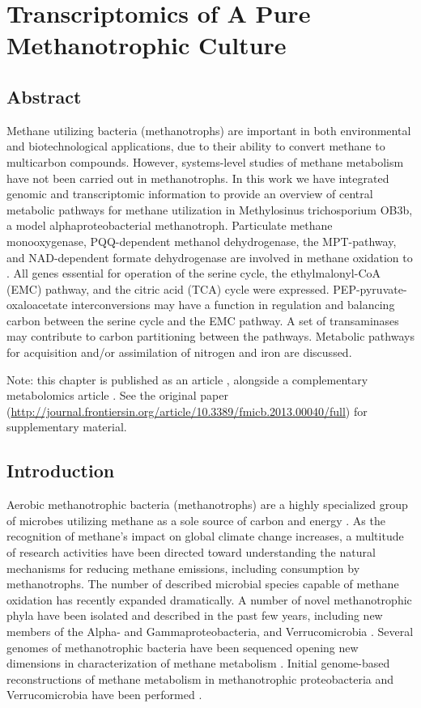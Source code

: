 \chapter{Transcriptomics of A Pure Methanotrophic Culture}
\label{chapter:A}


\section{Abstract}
Methane utilizing bacteria (methanotrophs) are important in both environmental and biotechnological applications, due to their ability to convert methane to multicarbon compounds.
However, systems-level studies of methane metabolism have not been carried out in methanotrophs.
In this work we have integrated genomic and transcriptomic information to provide an overview of central metabolic pathways for methane utilization in Methylosinus trichosporium OB3b, a model alphaproteobacterial methanotroph.
Particulate methane monooxygenase, PQQ-dependent methanol dehydrogenase, the MPT-pathway, and NAD-dependent formate dehydrogenase are involved in methane oxidation to .
All genes essential for operation of the serine cycle, the ethylmalonyl-CoA (EMC) pathway, and the citric acid (TCA) cycle were expressed.
PEP-pyruvate-oxaloacetate interconversions may have a function in regulation and balancing carbon between the serine cycle and the EMC pathway.
A set of transaminases may contribute to carbon partitioning between the pathways.
Metabolic pathways for acquisition and/or assimilation of nitrogen and iron are discussed.

Note: this chapter is published as an article \cite{matsenOB3b}, alongside a complementary metabolomics article \cite{yangOB3b}.
See the original paper (\url{http://journal.frontiersin.org/article/10.3389/fmicb.2013.00040/full}) for supplementary material.

\section{Introduction}
Aerobic methanotrophic bacteria (methanotrophs) are a highly specialized group of microbes utilizing methane as a sole source of carbon and energy \cite{hanson1996, murrell2009}.
As the recognition of methane’s impact on global climate change increases, a multitude of research activities have been directed toward understanding the natural mechanisms for reducing methane emissions, including consumption by methanotrophs.
The number of described microbial species capable of methane oxidation has recently expanded dramatically.
A number of novel methanotrophic phyla have been isolated and described in the past few years, including new members of the Alpha- and Gammaproteobacteria, and Verrucomicrobia \cite{trotsenko2008, mila2009, murrell2009}.
Several genomes of methanotrophic bacteria have been sequenced opening new dimensions in characterization of methane metabolism \cite{ward2004, dunfield2007, hou2008, chen2010, stein2010, stein2011, dam2012b}.
Initial genome-based reconstructions of methane metabolism in methanotrophic proteobacteria and Verrucomicrobia have been performed \cite{ward2004, kelly2005, hou2008, khadem2011}.

